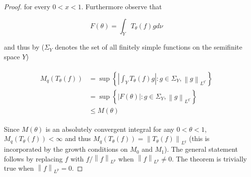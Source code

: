 \begin{proof}
	for every $0 < x < 1$. Furthermore observe that

	\begin{equation*}
		F(\theta) = \int_Y T_\theta(f)gd\nu
	\end{equation*}

	and thus by \cite[189]{folland:real_analysis:1999} ($\Sigma_Y$ denotes the set of all finitely simple functions on the semifinite space $Y$)

	\begin{gather*}
		\begin{aligned}
			M_q\left(T_\theta(f)\right) &= \sup\left\{ \left| \int_Y T_\theta(f) g\right| : g \in \Sigma_Y, \left\|g \right\|_{L^{q'}}\right\}\\
			&= \sup\left\{ \left| F(\theta)\right| : g \in \Sigma_Y, \left\| g \right\|_{L^{q'}}\right\}\\
			&\leq M(\theta)
		\end{aligned}
	\end{gather*}

	Since $M(\theta)$ is an absolutely convergent integral for any $0 < \theta < 1$, $M_q\left(T_\theta(f)\right) < \infty$ and thus $M_q\left(T_\theta(f)\right) = \left\| T_\theta(f)\right\|_{L^q}$ (this is incorporated by the growth conditions on $M_0$ and $M_1$). The general statement follows by replacing $f$ with $f/\left\| f\right\|_{L^p}$ when $\left\|f \right\|_{L^p} \neq 0$. The theorem is trivially true when $\left\| f\right\|_{L^p} = 0$.
\end{proof}
